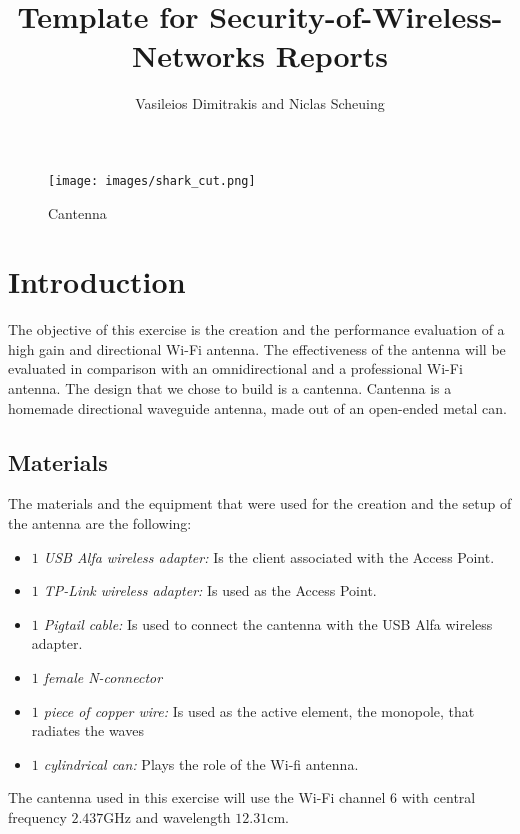 \documentclass[12pt,a4paper]{article}
\title{Template for Security-of-Wireless-Networks Reports}
\author{Vasileios Dimitrakis and Niclas Scheuing}
\begin{document}
\maketitle
\begin{figure}[h]
	\texttt{[image: images/shark\_cut.png]}
	\caption{Cantenna}
	\label{shark}
\end{figure}
\pagebreak
\section{Introduction}
The objective of this exercise is the creation and the performance evaluation of a high gain
and directional Wi-Fi antenna. The effectiveness of the antenna will be evaluated in comparison with an omnidirectional and a professional Wi-Fi antenna. The design that we chose to build is a cantenna. Cantenna is a homemade directional waveguide antenna, made out of an open-ended metal can.
\subsection{Materials}
The materials and the equipment that were used for the creation and the setup of the antenna are the following: 
\begin{itemize}
\item {\emph{$1$ USB Alfa wireless adapter:} Is the client associated with the Access Point.} 
\item {\emph{$1$ TP-Link wireless adapter:} Is used as the Access Point.}
\item {\emph{$1$ Pigtail cable:} Is used to connect the cantenna with the USB Alfa wireless adapter.}
\item {\emph{$1$ female N-connector}}
\item {\emph{$1$ piece of copper wire:} Is used as the active element, the monopole, that radiates the waves}
\item {\emph{$1$ cylindrical can:} Plays the role of the Wi-fi antenna.} 
\end{itemize}
The cantenna used in this exercise will use the Wi-Fi channel $6$ with central frequency $2.437$GHz and wavelength $12.31$cm.
\end{document}
